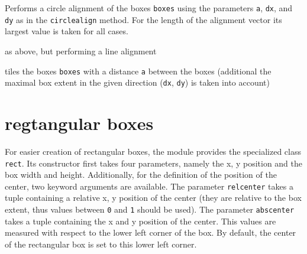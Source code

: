 \begin{description}
\raggedright
\item[\texttt{circlealignequal(boxes, a, dx, dy)}:] Performs a circle
alignment of the boxes \verb|boxes| using the parameters \verb|a|,
\verb|dx|, and \verb|dy| as in the \verb|circlealign| method. For the
length of the alignment vector its largest value is taken for all
cases.
\item[\texttt{linealignequal(boxes, a, dx, dy)}:] as above, but
performing a line alignment
\item[\texttt{tile(boxes, a, dx, dy)}:] tiles the boxes \verb|boxes|
with a distance \verb|a| between the boxes (additional the maximal box
extent in the given direction (\verb|dx|, \verb|dy|) is taken into
account)
\end{description}

\section{regtangular boxes}

For easier creation of rectangular boxes, the module provides the
specialized class \verb|rect|. Its constructor first takes four
parameters, namely the x, y position and the box width and height.
Additionally, for the definition of the position of the center, two
keyword arguments are available. The parameter \verb|relcenter| takes
a tuple containing a relative x, y position of the center (they are
relative to the box extent, thus values between \verb|0| and
\verb|1| should be used). The parameter \verb|abscenter| takes a tuple
containing the x and y position of the center. This values are
measured with respect to the lower left corner of the box. By
default, the center of the rectangular box is set to this lower left
corner.

